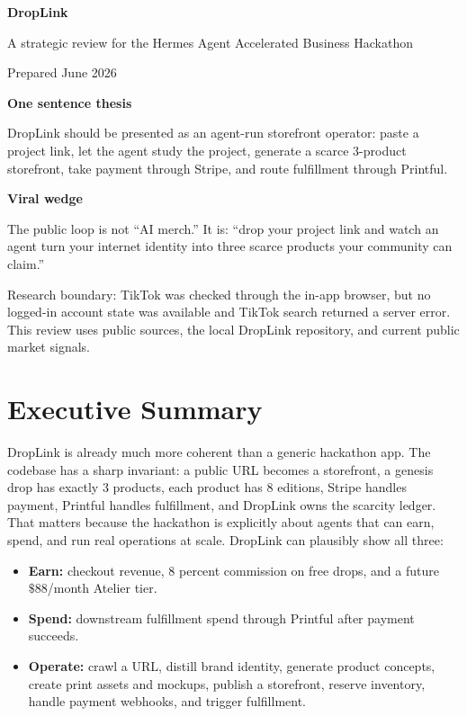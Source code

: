 \documentclass[11pt]{article}
\newcommand{\signalbox}[2]{
  \begin{tcolorbox}[colback=panel,colframe=line,arc=2mm,boxrule=0.4pt,left=8pt,right=8pt,top=7pt,bottom=7pt]
  \textbf{#1}\par
  #2
  \end{tcolorbox}
}
\begin{document}

\begin{titlepage}
  \vspace*{0.8in}
  {\Huge \bfseries DropLink\par}
  \vspace{0.18in}
  {\Large A strategic review for the Hermes Agent Accelerated Business Hackathon\par}
  \vspace{0.35in}
  {\large Prepared June 2026\par}
  \vfill
  \signalbox{One sentence thesis}{
    DropLink should be presented as an agent-run storefront operator: paste a project link, let the agent study the project, generate a scarce 3-product storefront, take payment through Stripe, and route fulfillment through Printful.
  }
  \vspace{0.2in}
  \signalbox{Viral wedge}{
    The public loop is not ``AI merch.'' It is: ``drop your project link and watch an agent turn your internet identity into three scarce products your community can claim.''
  }
  \vfill
  \textcolor{muted}{Research boundary: TikTok was checked through the in-app browser, but no logged-in account state was available and TikTok search returned a server error. This review uses public sources, the local DropLink repository, and current public market signals.}
\end{titlepage}

\tableofcontents
\newpage
{}

\section{Executive Summary}

DropLink is already much more coherent than a generic hackathon app. The codebase has a sharp invariant: a public URL becomes a storefront, a genesis drop has exactly 3 products, each product has 8 editions, Stripe handles payment, Printful handles fulfillment, and DropLink owns the scarcity ledger. That matters because the hackathon is explicitly about agents that can earn, spend, and run real operations at scale. DropLink can plausibly show all three:

\begin{itemize}
  \item \textbf{Earn:} checkout revenue, 8 percent commission on free drops, and a future \(\$88\)/month Atelier tier.
  \item \textbf{Spend:} downstream fulfillment spend through Printful after payment succeeds.
  \item \textbf{Operate:} crawl a URL, distill brand identity, generate product concepts, create print assets and mockups, publish a storefront, reserve inventory, handle payment webhooks, and trigger fulfillment.
\end{itemize}
\end{document}
